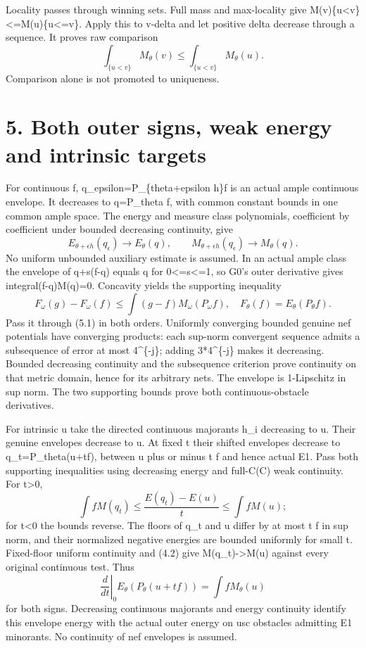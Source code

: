\documentclass[
  10pt,
]{article}
\begin{document}
Locality passes through winning sets. Full mass and max-locality give
M(v)\{u\textless v\}\textless=M(u)\{u\textless=v\}. Apply this to
v-delta and let positive delta decrease through a sequence. It proves
raw comparison \[
 \int_{\{u<v\}}M_\theta(v)\le\int_{\{u<v\}}M_\theta(u).                   \tag{4.13}
\] Comparison alone is not promoted to uniqueness.

\section{5. Both outer signs, weak energy and intrinsic
targets}\label{both-outer-signs-weak-energy-and-intrinsic-targets}

For continuous f, q\_epsilon=P\_\{theta+epsilon h\}f is an actual ample
continuous envelope. It decreases to q=P\_theta f, with common constant
bounds in one common ample space. The energy and measure class
polynomials, coefficient by coefficient under bounded decreasing
continuity, give \[
 E_{\theta+\epsilon h}(q_\epsilon)\to E_\theta(q),\qquad
 M_{\theta+\epsilon h}(q_\epsilon)\to M_\theta(q).                       \tag{5.1}
\] No uniform unbounded auxiliary estimate is assumed. In an actual
ample class the envelope of q+s(f-q) equals q for
0\textless=s\textless=1, so G0's outer derivative gives
integral(f-q)M(q)=0. Concavity yields the supporting inequality \[
 F_\omega(g)-F_\omega(f)\le\int(g-f)M_\omega(P_\omega f),\quad
 F_\theta(f)=E_\theta(P_\theta f).                                     \tag{5.2}
\] Pass it through (5.1) in both orders. Uniformly converging bounded
genuine nef potentials have converging products: each sup-norm
convergent sequence admits a subsequence of error at most 4\^{}\{-j\};
adding 3*4\^{}\{-j\} makes it decreasing. Bounded decreasing continuity
and the subsequence criterion prove continuity on that metric domain,
hence for its arbitrary nets. The envelope is 1-Lipschitz in sup norm.
The two supporting bounds prove both continuous-obstacle derivatives.

For intrinsic u take the directed continuous majorants h\_i decreasing
to u. Their genuine envelopes decrease to u. At fixed t their shifted
envelopes decrease to q\_t=P\_theta(u+tf), between u plus or minus
\textbar t\textbar{} \textbar\textbar f\textbar\textbar{} and hence
actual E1. Pass both supporting inequalities using decreasing energy and
full-C(C) weak continuity. For t\textgreater0, \[
 \int fM(q_t)\le\frac{E(q_t)-E(u)}t\le\int fM(u);                        \tag{5.3}
\] for t\textless0 the bounds reverse. The floors of q\_t and u differ
by at most \textbar t\textbar{} \textbar\textbar f\textbar\textbar{} in
sup norm, and their normalized negative energies are bounded uniformly
for small t. Fixed-floor uniform continuity and (4.2) give
M(q\_t)-\textgreater M(u) against every original continuous test. Thus
\[
 \left.\frac d{dt}\right|_0 E_\theta(P_\theta(u+tf))=\int fM_\theta(u)     \tag{5.4}
\] for both signs. Decreasing continuous majorants and energy continuity
identify this envelope energy with the actual outer energy on usc
obstacles admitting E1 minorants. No continuity of nef envelopes is
assumed.
\end{document}
